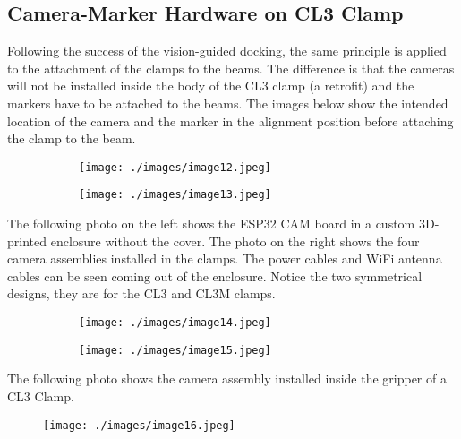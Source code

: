 \subsection{Camera-Marker Hardware on CL3 Clamp}

Following the success of the vision-guided docking, the same principle is applied to the attachment of the clamps to the beams. The difference is that the cameras will not be installed inside the body of the CL3 clamp (a retrofit) and the markers have to be attached to the beams. The images below show the intended location of the camera and the marker in the alignment position before attaching the clamp to the beam.

\begin{figure}[H]
\centering
\begin{subfigure}[b]{0.45\textwidth}
\centering
\texttt{[image: ./images/image12.jpeg]}
\end{subfigure}
\hfill
\begin{subfigure}[b]{0.45\textwidth}
\centering
\texttt{[image: ./images/image13.jpeg]}
\end{subfigure}
\end{figure}


The following photo on the left shows the ESP32 CAM board in a custom 3D-printed enclosure without the cover. The photo on the right shows the four camera assemblies installed in the clamps. The power cables and WiFi antenna cables can be seen coming out of the enclosure. Notice the two symmetrical designs, they are for the CL3 and CL3M clamps.

\begin{figure}[H]
\centering
\begin{subfigure}[b]{0.45\textwidth}
\centering
\texttt{[image: ./images/image14.jpeg]}
\end{subfigure}
\hfill
\begin{subfigure}[b]{0.45\textwidth}
\centering
\texttt{[image: ./images/image15.jpeg]}
\end{subfigure}
\end{figure}


The following photo shows the camera assembly installed inside the gripper of a CL3 Clamp. 

\begin{figure}[H]
\texttt{[image: ./images/image16.jpeg]}
\end{figure}


